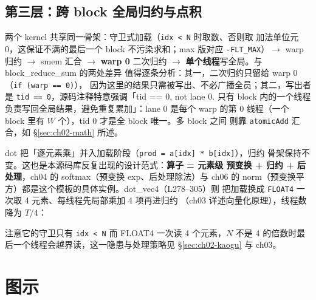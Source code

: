 \subsection{第三层：跨 block 全局归约与点积}\label{sec:ch02-global}





两个 kernel 共享同一骨架：守卫式加载（\texttt{idx < N} 时取数、否则取
加法单位元 0，这保证不满的最后一个 block 不污染求和；max 版对应
\texttt{-FLT\_MAX}）$\to$ warp 归约 $\to$ smem 汇合 $\to$ \textbf{warp 0}
二次归约 $\to$ \textbf{单个线程}写全局。与 block\_reduce\_sum 的两处差异
值得逐条分析：其一，二次归约只留给 warp 0（\texttt{if (warp == 0)}），
因为这里的结果只需被写出、不必广播全员；其二，写出者是
\texttt{tid == 0}，源码注释特意强调「tid == 0, not lane 0. 只有 block
内的一个线程负责写回全局结果，避免重复累加」：lane 0 是每个 warp 的第 0
线程（一个 block 里有 $W$ 个），tid 0 才是全 block 唯一。多 block 之间
则靠 \texttt{atomicAdd} 汇合，如 \S\ref{sec:ch02-math} 所述。

dot 把「逐元素乘」并入加载阶段（\texttt{prod = a[idx] * b[idx]}），归约
骨架保持不变。这也是本源码库反复出现的设计范式：\textbf{算子 = 元素级
预变换 + 归约 + 后处理}，ch04 的 softmax（预变换 exp、后处理除法）与
ch06 的 norm（预变换平方）都是这个模板的具体实例。dot\_vec4（L278--305）则
把加载换成 \texttt{FLOAT4} 一次取 4 元素、每线程先局部乘加 4 项再进归约
（ch03 详述向量化原理），线程数降为 $T/4$：



注意它的守卫只有 \texttt{idx < N} 而 FLOAT4 一次读 4 个元素，$N$ 不是
4 的倍数时最后一个线程会越界读，这一隐患与处理策略见
\S\ref{sec:ch02-kaogu} 与 ch03。

\section{图示}

